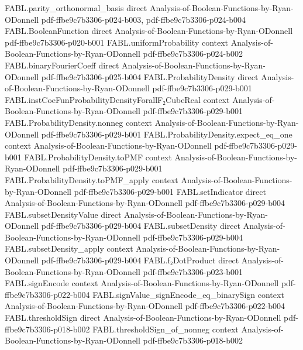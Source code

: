 \begin{theorem}
\proofstep
  {FABL.parity_orthonormal_basis}
  {direct}
  {Analysis-of-Boolean-Functions-by-Ryan-ODonnell}
  {pdf-ffbe9c7b3306-p024-b003,
    pdf-ffbe9c7b3306-p024-b004}
\proofstep
  {FABL.BooleanFunction}
  {direct}
  {Analysis-of-Boolean-Functions-by-Ryan-ODonnell}
  {pdf-ffbe9c7b3306-p020-b001}
\proofstep
  {FABL.uniformProbability}
  {context}
  {Analysis-of-Boolean-Functions-by-Ryan-ODonnell}
  {pdf-ffbe9c7b3306-p024-b002}
\proofstep
  {FABL.binaryFourierCoeff}
  {direct}
  {Analysis-of-Boolean-Functions-by-Ryan-ODonnell}
  {pdf-ffbe9c7b3306-p025-b004}
\proofstep
  {FABL.ProbabilityDensity}
  {direct}
  {Analysis-of-Boolean-Functions-by-Ryan-ODonnell}
  {pdf-ffbe9c7b3306-p029-b001}
\proofstep
  {FABL.instCoeFunProbabilityDensityForallF₂CubeReal}
  {context}
  {Analysis-of-Boolean-Functions-by-Ryan-ODonnell}
  {pdf-ffbe9c7b3306-p029-b001}
\proofstep
  {FABL.ProbabilityDensity.nonneg}
  {context}
  {Analysis-of-Boolean-Functions-by-Ryan-ODonnell}
  {pdf-ffbe9c7b3306-p029-b001}
\proofstep
  {FABL.ProbabilityDensity.expect_eq_one}
  {context}
  {Analysis-of-Boolean-Functions-by-Ryan-ODonnell}
  {pdf-ffbe9c7b3306-p029-b001}
\proofstep
  {FABL.ProbabilityDensity.toPMF}
  {context}
  {Analysis-of-Boolean-Functions-by-Ryan-ODonnell}
  {pdf-ffbe9c7b3306-p029-b001}
\proofstep
  {FABL.ProbabilityDensity.toPMF_apply}
  {context}
  {Analysis-of-Boolean-Functions-by-Ryan-ODonnell}
  {pdf-ffbe9c7b3306-p029-b001}
\proofstep
  {FABL.setIndicator}
  {direct}
  {Analysis-of-Boolean-Functions-by-Ryan-ODonnell}
  {pdf-ffbe9c7b3306-p029-b004}
\proofstep
  {FABL.subsetDensityValue}
  {direct}
  {Analysis-of-Boolean-Functions-by-Ryan-ODonnell}
  {pdf-ffbe9c7b3306-p029-b004}
\proofstep
  {FABL.subsetDensity}
  {direct}
  {Analysis-of-Boolean-Functions-by-Ryan-ODonnell}
  {pdf-ffbe9c7b3306-p029-b004}
\proofstep
  {FABL.subsetDensity_apply}
  {context}
  {Analysis-of-Boolean-Functions-by-Ryan-ODonnell}
  {pdf-ffbe9c7b3306-p029-b004}
\proofstep
  {FABL.f₂DotProduct}
  {direct}
  {Analysis-of-Boolean-Functions-by-Ryan-ODonnell}
  {pdf-ffbe9c7b3306-p023-b001}
\proofstep
  {FABL.signEncode}
  {context}
  {Analysis-of-Boolean-Functions-by-Ryan-ODonnell}
  {pdf-ffbe9c7b3306-p022-b004}
\proofstep
  {FABL.signValue_signEncode_eq_binarySign}
  {context}
  {Analysis-of-Boolean-Functions-by-Ryan-ODonnell}
  {pdf-ffbe9c7b3306-p022-b004}
\proofstep
  {FABL.thresholdSign}
  {direct}
  {Analysis-of-Boolean-Functions-by-Ryan-ODonnell}
  {pdf-ffbe9c7b3306-p018-b002}
\proofstep
  {FABL.thresholdSign_of_nonneg}
  {context}
  {Analysis-of-Boolean-Functions-by-Ryan-ODonnell}
  {pdf-ffbe9c7b3306-p018-b002}

\end{theorem}
